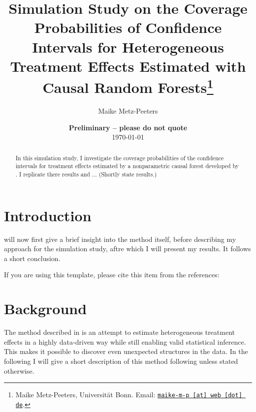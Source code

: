 \documentclass[11pt, a4paper, leqno]{article}
\begin{document}
\title{Simulation Study on the Coverage Probabilities of Confidence Intervals for Heterogeneous Treatment Effects Estimated with Causal Random Forests\thanks{Maike Metz-Peeters, Universität Bonn. Email: \href{mailto:maike-m-p@web.de}{\nolinkurl{maike-m-p [at] web [dot] de}}.}}

\author{Maike Metz-Peeters}

\date{
{\bf Preliminary -- please do not quote} 
\\[1ex] 
\today
}

\maketitle


\begin{abstract}
	In this simulation study, I investigate the coverage probabilities of the confidence intervals for treatment effects estimated by a nonparametric causal forest developed by \citet{wa18}. I replicate there results and ... 
    (Shortly state results.)
    
\end{abstract}
\clearpage

\section{Introduction} %
\label{sec:introduction}

will now first give a brief insight into the method itself, before describing my approach for the simulation study, aftre which I will present my results. It follows a short conclusion.


If you are using this template, please cite this item from the references: \citet{GaudeckerEconProjectTemplates}


\section{Background} %
\label{sec:background}
The method described in \citet{wa18} is an attempt to estimate heterogeneous treatment effects in a highly data-driven way while still enabling valid statistical inference. This makes it possible to discover even unexpected structures in the data. In the following I will give a short description of this method following \citet{wa18} unless stated otherwise.
\end{document}
